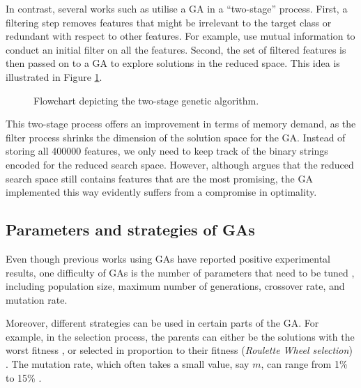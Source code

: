 \documentclass[12pt, twoside, a4paper]{report}
\begin{document}
In contrast, several works such as \cite{RefWorks:197, RefWorks:198, RefWorks:199, RefWorks:200, RefWorks:203} utilise a GA in a ``two-stage'' process. First, a filtering step removes features that might be irrelevant to the target class or redundant with respect to other features. For example, \cite{RefWorks:197, RefWorks:198, RefWorks:203} use mutual information to conduct an initial filter on all the features. Second, the set of filtered features is then passed on to a GA to explore solutions in the reduced space. This idea is illustrated in Figure \ref{bg:fs:ga:twoStage}.

\begin{figure}
\centering
{}
\caption{Flowchart depicting the two-stage genetic algorithm.}
\label{bg:fs:ga:twoStage}
\end{figure}

This two-stage process offers an improvement in terms of memory demand, as the filter process shrinks the dimension of the solution space for the GA. Instead of storing all 400000 features, we only need to keep track of the binary strings encoded for the reduced search space. However, although \cite{RefWorks:201} argues that the reduced search space still contains features that are the most promising, the GA implemented this way evidently suffers from a compromise in optimality.

\subsection{Parameters and strategies of GAs}
Even though previous works using GAs have reported positive experimental results, one difficulty of GAs is the number of parameters that need to be tuned \cite{RefWorks:210}, including population size, maximum number of generations, crossover rate, and mutation rate.

Moreover, different strategies can be used in certain parts of the GA. For example, in the selection process, the parents can either be the solutions with the worst fitness \cite{RefWorks:203}, or selected in proportion to their fitness (\textit{Roulette Wheel selection}) \cite{RefWorks:205, RefWorks:227}. The mutation rate, which often takes a small value, say $m$, can range from  1\% to 15\% \cite{RefWorks:206}.
\end{document}
